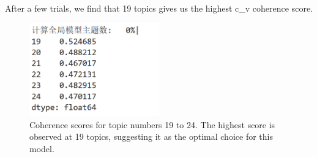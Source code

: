 \documentclass[12pt]{article}
\numberwithin{figure}{section}  %
\begin{document}
	After a few trials, we find that 19 topics gives us the highest c\_v
	coherence score. 
	\begin{figure}[H]
		\centering
		\includegraphics[width=0.5\textwidth]{Q2CV1} 
		\caption{\centering Coherence scores for topic numbers 19 to 24. The highest score is observed at 19 topics, suggesting it as the optimal choice for this model.}		
	\end{figure}
	
\end{document}
